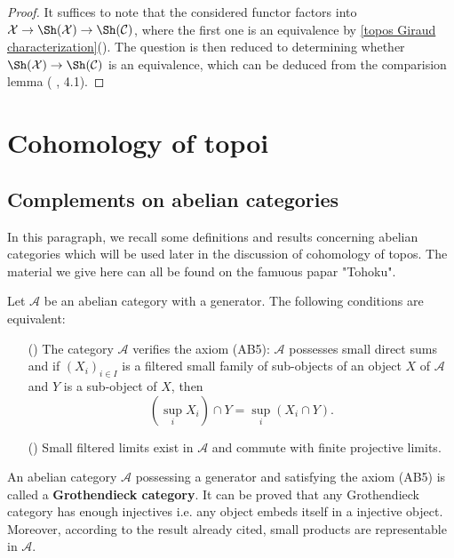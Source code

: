 \begin{proof}
It suffices to note that the considered functor factors into $\mathcal{X}\to \Sh(\mathcal{X})\to \Sh(\mathcal{C})$, where the first one is an equivalence by \cref{topos Giraud characterization}(). The question is then reduced to determining whether $\Sh(\mathcal{X})\to \Sh(\mathcal{C})$ is an equivalence, which can be deduced from the comparision lemma (\cite{SGA4-1} , 4.1).
\end{proof}
\section{Cohomology of topoi}

\subsection{Complements on abelian categories}
In this paragraph, we recall some definitions and results concerning abelian categories which will be used later in the discussion of cohomology of topos. The material we give here can all be found on the famuous papar "Tohoku".

\begin{proposition}\label{abelian cat with generator AB5 iff}
Let $\mathcal{A}$ be an abelian category with a generator. The following conditions are equivalent:
\begin{enumerate}
    \item[(\rmnum{1})] The category $\mathcal{A}$ verifies the axiom (AB5): $\mathcal{A}$ possesses small direct sums and if $(X_i)_{i\in I}$ is a filtered small family of sub-objects of an object $X$ of $\mathcal{A}$ and $Y$ is a sub-object of $X$, then
    \[(\sup_iX_i)\cap Y=\sup_i(X_i\cap Y).\]
    \item[(\rmnum{2})] Small filtered limits exist in $\mathcal{A}$ and commute with finite projective limits.
\end{enumerate}
\end{proposition}

An abelian category $\mathcal{A}$ possessing a generator and satisfying
the axiom (AB5) is called a \textbf{Grothendieck category}. It can be proved that any Grothendieck category has enough injectives i.e. any object embeds itself in a injective object. Moreover, according to the result already cited, small products are representable in $\mathcal{A}$.

